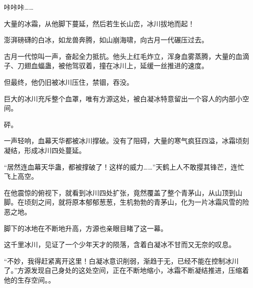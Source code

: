 \begin{this_body}
咔咔咔……

大量的冰霜，从他脚下蔓延，然后若生长山峦，冰川拔地而起！

澎湃磅礴的白冰，如龙兽奔腾，如山崩海啸，向古月一代碾压过去。

古月一代惊叫一声，奋起全力抵抗。他头上红毛炸立，浑身血雾蒸腾，大量的血滴子、刀翅血蝠蛊，被他驾驭着，撞在冰川上，延缓一丝推进的速度。

但最终，他仍旧被冰川压住，禁锢，吞没。

巨大的冰川充斥整个血罩，唯有方源这处，被白凝冰特意留出一个容人的内部小空间。

砰。

一声轻响，血幕天华都被冰川撑破。没有了阻碍，大量的寒气疯狂四溢，冰霜顷刻凝结，形成冰川四处蔓延。

“居然连血幕天华蛊，都被撑破了！这样的威力……”天鹤上人不敢撄其锋芒，连忙飞上高空。

在他震惊的俯视下，就看到冰川四处扩张，竟然覆盖了整个青茅山，从山顶到山脚。在顷刻之间，就将原本郁郁葱葱，生机勃勃的青茅山，化为一片冰霜风雪的险恶之地。

脚下的冰地在不断地升高，方源也亲眼目睹了这一幕。

这千里冰川，见证了一个少年天才的陨落，含着白凝冰不甘而又无奈的叹息。

“不妙，我得赶紧离开这里！白凝冰意识削弱，渐趋于无，已经不能在控制冰川了。”方源发现自己身处的这处空间，正在不断地缩小，冰霜不断凝结推进，压缩着他的生存空间。。

\end{this_body}

